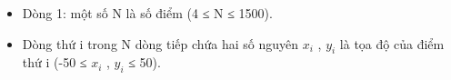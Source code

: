 \begin{itemize}
	\item     Dòng 1: một số N là số điểm (4 ≤ N ≤ 1500).   
	\item     Dòng thứ i trong N dòng tiếp chứa hai số nguyên   $x_{i}$    , $y_{i}$    là tọa độ của điểm thứ i (-50   ≤ $x_{i}$    , $y_{i}$    ≤ 50).   
\end{itemize}
